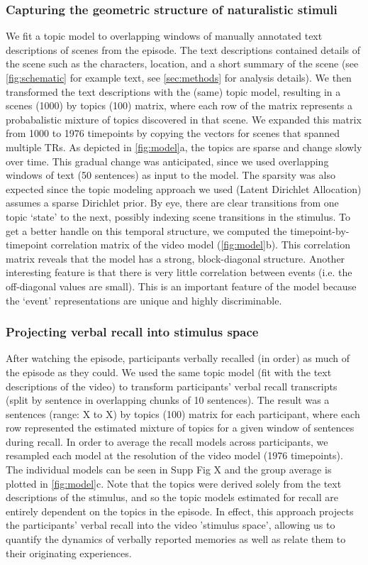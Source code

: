 \documentclass{article}
\begin{document}
{\subsubsection{Capturing the geometric structure of naturalistic stimuli}
We fit a topic model to overlapping windows of manually annotated text descriptions of scenes from the episode. The text descriptions contained details of the scene such as the characters, location, and a short summary of the scene (see \ref{fig:schematic} for example text, see \ref{sec:methods} for analysis details). We then transformed the text descriptions with the (same) topic model, resulting in a scenes (1000) by topics (100) matrix, where each row of the matrix represents a probabalistic mixture of topics discovered in that scene. We expanded this matrix from 1000 to 1976 timepoints by copying the vectors for scenes that spanned multiple TRs. As depicted in \ref{fig:model}a, the topics are sparse and change slowly over time. This gradual change was anticipated, since we used overlapping windows of text (50 sentences) as input to the model. The sparsity was also expected since the topic modeling approach we used (Latent Dirichlet Allocation) assumes a sparse Dirichlet prior. By eye, there are clear transitions from one topic `state' to the next, possibly indexing scene transitions in the stimulus.  To get a better handle on this temporal structure, we computed the timepoint-by-timepoint correlation matrix of the video model (\ref{fig:model}b).  This correlation matrix reveals that the model has a strong, block-diagonal structure.  Another interesting feature is that there is very little correlation between events (i.e. the off-diagonal values are small). This is an important feature of the model because the `event' representations are unique and highly discriminable.

\subsubsection{Projecting verbal recall into stimulus space}
After watching the episode, participants verbally recalled (in order) as much of the episode as they could.  We used the same topic model (fit with the text descriptions of the video) to transform participants' verbal recall transcripts (split by sentence in overlapping chunks of 10 sentences). The result was a sentences (range: X to X) by topics (100) matrix for each participant, where each row represented the estimated mixture of topics for a given window of sentences during recall. In order to average the recall models across participants, we resampled each model at the resolution of the video model (1976 timepoints). The individual models can be seen in Supp Fig X and the group average is plotted in \ref{fig:model}c. Note that the topics were derived solely from the text descriptions of the stimulus, and so the topic models estimated for recall are entirely dependent on the topics in the episode. In effect, this approach projects the participants' verbal recall into the video 'stimulus space', allowing us to quantify the dynamics of verbally reported memories as well as relate them to their originating experiences.

}
\end{document}
